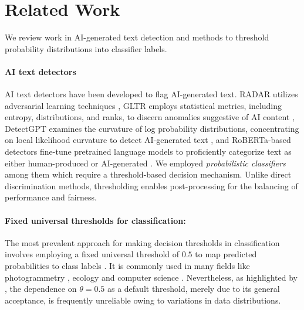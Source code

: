 \section{Related Work}
We review work in AI-generated text detection and methods to threshold probability distributions into classifier labels.

\paragraph{AI text detectors}
AI text detectors have been developed to flag AI-generated text. RADAR utilizes adversarial learning techniques \cite{hu2023radar}, GLTR employs statistical metrics, including entropy, distributions, and ranks, to discern anomalies suggestive of AI content \cite{gehrmann2019gltr}, DetectGPT examines the curvature of log probability distributions, concentrating on local likelihood curvature to detect AI-generated text \cite{mitchell2023detectgpt}, and RoBERTa-based detectors fine-tune pretrained language models to proficiently categorize text as either human-produced or AI-generated \cite{solaiman2019release}. We employed \textit{probabilistic classifiers} among them which require a threshold-based decision mechanism. Unlike direct discrimination methods, thresholding enables post-processing for the balancing of performance and fairness.


\paragraph{Fixed universal thresholds for classification:}\label{method1:static} 
The most prevalent approach for making decision thresholds in classification involves employing a fixed universal threshold of $0.5$ to map predicted probabilities to class labels \cite{freeman2008comparison}. It is commonly used in many fields like photogrammetry \cite{shao2016characterizing}, ecology \cite{manel1999comparing, hanberry2013prevalence} and computer science \cite{lu2024mlnet}. Nevertheless, as highlighted by \citet{freeman2008comparison}, the dependence on $\theta = 0.5$ as a default threshold, merely due to its general acceptance, is frequently unreliable owing to variations in data distributions. 

